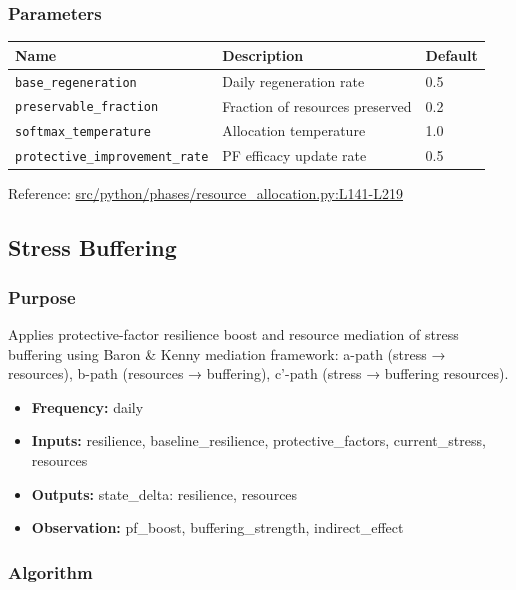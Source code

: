 \documentclass[
  letterpaper,
  DIV=11,
  numbers=noendperiod]{scrartcl}
\providecommand{\tightlist}{%
  \setlength{\itemsep}{0pt}\setlength{\parskip}{0pt}}
\newcommand{\trow}[3]{%
  \texttt{\allowbreak #1} & #2 & #3 \\
}
\begin{document}
\subsubsection{Parameters}\label{parameters-4}

\begin{tabularx}{\textwidth}{p{4.5cm}Xp{2cm}}
\toprule
\textbf{Name} & \textbf{Description} & \textbf{Default} \\
\midrule
\trow{base\_regeneration}{Daily regeneration rate}{0.5}
\trow{preservable\_fraction}{Fraction of resources preserved}{0.2}
\trow{softmax\_temperature}{Allocation temperature}{1.0}
\trow{protective\_improvement\_rate}{PF efficacy update rate}{0.5}
\bottomrule
\end{tabularx}

Reference:
\href{https://github.com/namakala/abm-simulation/blob/84ff9b37fb0c569bef9f122e789d9c23a89348ec/src/python/phases/resource_allocation.py\#L141-L219}{src/python/phases/resource\_allocation.py:L141-L219}

\subsection{Stress Buffering}\label{stress-buffering}

\subsubsection{Purpose}\label{purpose-7}

Applies protective-factor resilience boost and resource mediation of
stress buffering using Baron \& Kenny mediation framework: a-path
(stress → resources), b-path (resources → buffering), c'-path (stress →
buffering \textbar{} resources).

\begin{itemize}
\tightlist
\item
  \textbf{Frequency:} daily
\item
  \textbf{Inputs:} resilience, baseline\_resilience,
  protective\_factors, current\_stress, resources
\item
  \textbf{Outputs:} state\_delta: resilience, resources
\item
  \textbf{Observation:} pf\_boost, buffering\_strength, indirect\_effect
\end{itemize}

\subsubsection{Algorithm}\label{algorithm-5}
\end{document}
